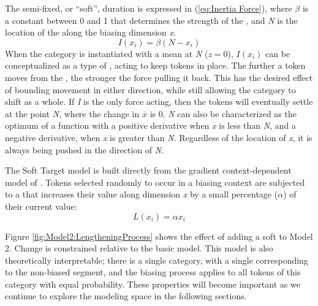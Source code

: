 The semi-fixed, or “soft”, duration  is expressed in (\ref{eq:Inertia Force}),
where $\beta$ is a constant between 0 and 1 that determines the strength
of the , and \emph{N} is the location of the  along the
biasing dimension \emph{x}.
\begin{equation}
I(x_{i})=\beta(N-x_{i})\label{eq:Inertia Force}
\end{equation}
When the category is instantiated with a mean at \emph{N} ($z=0$),
$I(x_{i})$ can be conceptualized as a type of , acting to keep
tokens in place. The further a token moves from the , the stronger
the force pulling it back. This has the desired effect of bounding
movement in either direction, while still allowing the category to
shift as a whole. If \emph{I} is the only force acting, then the tokens
will eventually settle at the  point \emph{N}, where the
change in \emph{$\overline{x}$} is 0. \emph{N} can also be characterized
as the optimum of a function with a positive derivative when \emph{x}
is less than \emph{N}, and a negative derivative, when \emph{x} is
greater than \emph{N}. Regardless of the location of \emph{x}, it
is always being pushed in the direction of \emph{N}. 

The Soft Target model is built directly from the gradient context-dependent
model of . Tokens selected
randomly to occur in a biasing context are subjected to a  that
increases their value along dimension \emph{x} by a small percentage
($\alpha$) of their current value: 
\begin{equation}
L(x_{i})=\alpha x_{i}\label{eq:Lengthening Force}
\end{equation}

Figure \ref{fig:Model2:LengtheningProcess} shows the effect of adding
a soft  to Model 2. Change is constrained relative to the basic
model. This model is also theoretically interpretable; there is a
single category, with a single   corresponding to
the non-biased segment, and the biasing process applies to all tokens
of this category with equal probability. These properties will become
important as we continue to explore the modeling space in the following
sections. 

